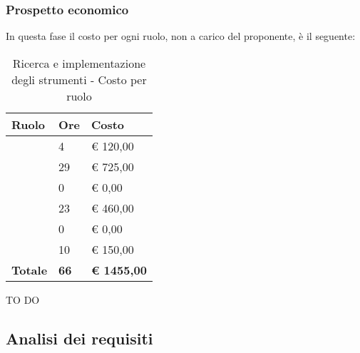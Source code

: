 		\subsubsection{Prospetto economico} %
		\label{ssub:prospetto_economico}
		In questa fase il costo per ogni ruolo, non a carico del proponente, è il seguente: \\
			\begin{table}[!h]
				\begin{center}
					\begin{tabularx}{0.65\textwidth}{|l|l|X|}
						\hline
						\textbf{Ruolo} & \textbf{Ore} & \textbf{Costo} \\
						\hline
						\roleProjectManager & 4 & \euro{} 120,00 \\
						\hline
						\roleAnalyst & 29 & \euro{} 725,00 \\
						\hline
						\roleDesigner & 0 & \euro{} 0,00 \\
						\hline
						\roleAdministrator & 23 & \euro{} 460,00 \\
						\hline
						\roleProgrammer & 0 & \euro{} 0,00 \\
						\hline
						\roleVerifier & 10 & \euro{} 150,00 \\
						\hline
						\textbf{Totale} & \textbf{66} & \textbf{\euro{} 1455,00} \\
						\hline
					\end{tabularx}
				\end{center}
			\caption{Ricerca e implementazione degli strumenti - Costo per ruolo}
			\end{table}

		\noindent
		TO DO
		
	
	
	\subsection{Analisi dei requisiti} %
	\label{sub:analisi_dei_requisiti}
